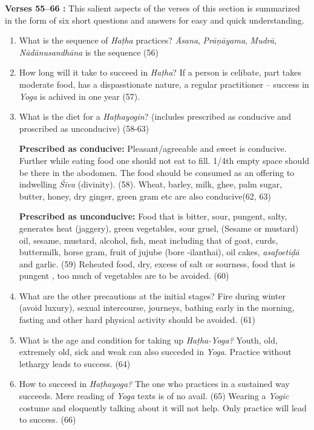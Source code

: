 \textbf{Verses 55--66 :} This salient aspects of the verses of this section is summarized in the form of six short questions and answers for easy and quick understanding.

\begin{enumerate}
\item What is the sequence of \textit{Haṭha} practices?  \textit{Āsana}, \textit{Prāṇāyama}, \textit{Mudrā}, \textit{Nādānusandhāna} is the sequence (56)
\item How long will it take to succeed in \textit{Haṭha}? If a person is celibate, part takes moderate food, has a dispasstionate nature, a regular practitioner – success in \textit{Yoga} is achived in one year (57).
\item What is the diet for a \textit{Haṭhayogin}? (includes prescribed as conducive and proscribed as unconducive) (58-63)   

\textbf{Prescribed as conducive:} Pleasant/agreeable and sweet is conducive. Further while eating food  one should not eat to fill. 1/4th  empty space should be there in the abodomen. The food should be consumed as an offering to indwelling \textit{Śiva} (divinity). (58). Wheat, barley, milk, ghee, palm sugar, butter, honey, dry ginger, green gram etc  are also conducive(62, 63)

\textbf{Prescribed as unconducive:} Food that is bitter, sour, pungent, salty, generates heat (jaggery), green vegetables, sour gruel, (Sesame or mustard) oil, sesame, mustard, alcohol, fish, meat including that of goat, curds, buttermilk, horse gram, fruit of jujube (bore -ilanthai), oil cakes, \textit{asafoetiḍā} and garlic. (59) Reheated food, dry, excess of salt or sourness, food that is pungent , too much of vegetables are to be avoided. (60)
\item What are the other precautions at the initial stages?    Fire during winter (avoid luxury), sexual intercourse, journeys, bathing early in the morning, fasting and other hard physical activity should be avoided. (61)  
\item What is the age and condition for taking up \textit{Haṭha-Yoga?} Youth, old, extremely old, sick and weak can also succeded in \textit{Yoga}. Practice without lethargy leads to success. (64)
\item How to succeed in \textit{Haṭhayoga?} The one who practices in a sustained way succeeds. Mere reading of \textit{Yoga} texts is of no avail. (65) Wearing a \textit{Yogic} costume and eloquently talking about it will not help. Only practice will lead to success. (66) 
\end{enumerate}

